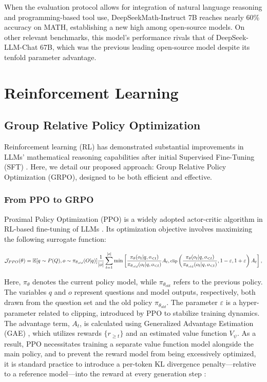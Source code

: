 When the evaluation protocol allows for integration of natural language reasoning and programming-based tool use, DeepSeekMath-Instruct 7B reaches nearly 60\% accuracy on MATH, establishing a new high among open-source models. On other relevant benchmarks, this model’s performance rivals that of DeepSeek-LLM-Chat 67B, which was the previous leading open-source model despite its tenfold parameter advantage.

\section{Reinforcement Learning}

\subsection{Group Relative Policy Optimization}
Reinforcement learning (RL) has demonstrated substantial improvements in LLMs’ mathematical reasoning capabilities after initial Supervised Fine-Tuning (SFT) \citep{wang2023math,wizardmath}. Here, we detail our proposed approach: Group Relative Policy Optimization (GRPO), designed to be both efficient and effective.

\subsubsection{From PPO to GRPO}
Proximal Policy Optimization (PPO) \citep{schulman2017proximal} is a widely adopted actor-critic algorithm in RL-based fine-tuning of LLMs \citep{ouyang2022training}. Its optimization objective involves maximizing the following surrogate function:

\begin{equation}
\footnotesize
    \mathcal{J}_{PPO}(\theta) = \mathbb{E}{[q \sim P(Q), o \sim \pi_{\theta_{old}}(O|q)]} \frac{1}{|o|} \sum_{t=1}^{|o|} \min \left[ \frac{\pi_\theta(o_{t} | q, o_{<t})}{\pi_{\theta_{old}}(o_{t} | q, o_{<t})} A_{t}, \text{clip} \left( \frac{\pi_\theta(o_{t} | q, o_{<t})}{\pi_{\theta_{old}}(o_{t} | q, o_{<t})}, 1 - \varepsilon, 1 + \varepsilon \right)  A_{t} \right] ,
\end{equation}

Here, $\pi_{\theta}$ denotes the current policy model, while $\pi_{\theta_{old}}$ refers to the previous policy. The variables $q$ and $o$ represent questions and model outputs, respectively, both drawn from the question set and the old policy $\pi_{\theta_{old}}$. The parameter $\varepsilon$ is a hyper-parameter related to clipping, introduced by PPO to stabilize training dynamics. The advantage term, $A_t$, is calculated using Generalized Advantage Estimation (GAE) \citep{gae}, which utilizes rewards $\{r_{\ge t}\}$ and an estimated value function $V_{\psi}$. As a result, PPO necessitates training a separate value function model alongside the main policy, and to prevent the reward model from being excessively optimized, it is standard practice to introduce a per-token KL divergence penalty—relative to a reference model—into the reward at every generation step \citep{ouyang2022training}:

